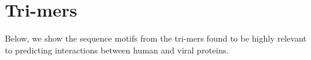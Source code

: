 \documentclass[a4paper,11pt]{article}
\begin{document}
\begin{figure}[h]
\begin{floatrow}
\end{floatrow}
\end{figure}

\newpage

\section{Tri-mers}

Below, we show the sequence motifs from the tri-mers found to be highly relevant to predicting interactions between human and viral proteins.
\end{document}
